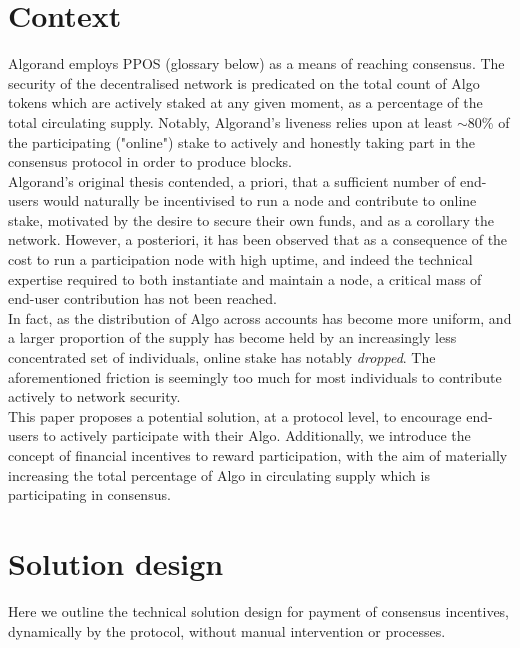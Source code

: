 \documentclass[11pt,a4paper]{article}
\begin{document}
\pagebreak

\section{Context}
Algorand employs \gls{PPOS} (glossary below) as a means of reaching consensus. The security of the decentralised network 
is predicated on the total count of Algo tokens which are actively staked at any given moment, as a percentage of the 
total circulating supply. Notably, Algorand's liveness relies upon at least $\sim$80\% of the participating ("online") 
stake to actively and honestly taking part in the consensus protocol in order to produce blocks. \\ 

Algorand's original thesis contended, a priori, that a sufficient number of end-users would naturally be incentivised to 
run a node and contribute to online stake, motivated by the desire to secure their own funds, and as a corollary the 
network. However, a posteriori, it has been observed that as a consequence of the cost to run a participation node with 
high uptime, and indeed the technical expertise required to both instantiate and maintain a node, a critical mass of 
end-user contribution has not been reached. \\

In fact, as the distribution of Algo across accounts has become more uniform, and a larger proportion of the supply has 
become held by an increasingly less concentrated set of individuals, online stake has notably \emph{dropped}. The 
aforementioned friction is seemingly too much for most individuals to contribute actively to network security. \\

This paper proposes a potential solution, at a protocol level, to encourage end-users to actively participate with their 
Algo. Additionally, we introduce the concept of financial incentives to reward participation, with the aim of materially 
increasing the total percentage of Algo in circulating supply which is participating in consensus. 

\pagebreak

\section{Solution design}
Here we outline the technical solution design for payment of consensus incentives, dynamically by the protocol, without 
manual intervention or processes. 
\end{document}

